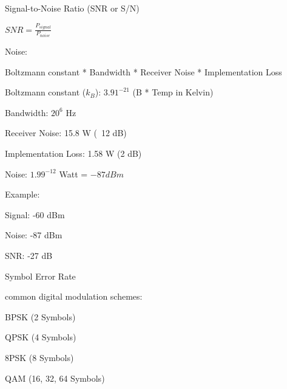 \documentclass[9pt]{article}
\begin{document}
\begin{slide}
\bi
	\item Signal-to-Noise Ratio (SNR or S/N)
	\item $SNR = \frac{P_{signal}}{P_{noise}}$
	\item Noise:
	\bi
		\item Boltzmann constant * Bandwidth * Receiver Noise * Implementation Loss
		\item Boltzmann constant ($k_B$): $3.91^{-21}$ (B * Temp in Kelvin)
		\item Bandwidth: $20^6$ Hz
		\item Receiver Noise: 15.8 W (~12 dB)
		\item Implementation Loss: 1.58 W (2 dB)
	\ei
	\item Noise: $1.99^{-12}$ Watt = $-87 dBm$
	\item Example:
	\bi
		\item Signal: -60 dBm
		\item Noise: -87 dBm
		\item SNR: -27 dB
	\ei
\ei
\end{slide}


\begin{slide}
\bi
	\item Symbol Error Rate
	\item common digital modulation schemes:
	\bi
		\item BPSK (2 Symbols)
		\item QPSK (4 Symbols)
		\item 8PSK (8 Symbols)
		\item QAM (16, 32, 64 Symbols)
	\ei
\ei
\end{slide}
\end{document}
